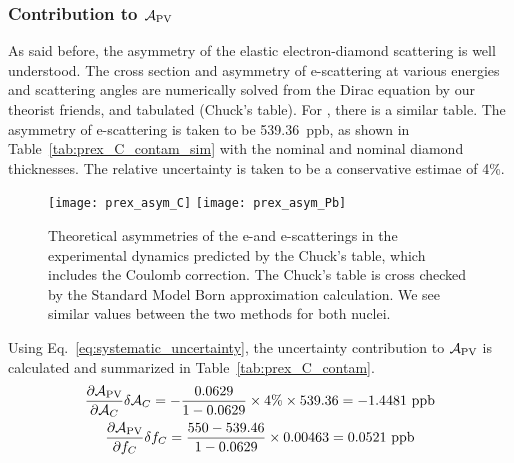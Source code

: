 \subsubsection{Contribution to $\mathcal{A}_{\text{PV}}$}
As said before, the asymmetry of the elastic electron-diamond scattering is well understood.
The cross section and asymmetry of e-\Carbon scattering at various energies 
and scattering angles are numerically solved from the Dirac equation by our 
theorist friends, and tabulated (Chuck's table). For \Pb, there is a similar table.
The asymmetry of e-\Carbon scattering is taken to be 539.36~ppb, as shown in 
Table~\ref{tab:prex_C_contam_sim}
with the nominal \Pb and nominal diamond thicknesses. The relative uncertainty is taken
to be a conservative estimae of 4\%.
\begin{figure}[!h]
    \centering
    \texttt{[image: prex\_asym\_C]}
    \texttt{[image: prex\_asym\_Pb]}
    \caption[Theoretical asymmetries of the e-\Carbon and e-\Pb scattering]
    {Theoretical asymmetries of the e-\Carbon and e-\Pb scatterings in the experimental 
    dynamics predicted by the Chuck's table, which includes the Coulomb correction. 
    The Chuck's table is cross checked by the Standard Model Born approximation 
    calculation. We see similar values between the two methods for both nuclei.}
    \label{fig:prex_asym}
\end{figure}

Using Eq.~\ref{eq:systematic_uncertainty}, the uncertainty contribution to $\mathcal{A}_{\text{PV}}$
is calculated and summarized in Table~\ref{tab:prex_C_contam}.
\begin{equation}
    \begin{gathered}
	\frac{\partial \mathcal{A}_{\text{PV}}}{\partial \mathcal{A}_C} \delta \mathcal{A}_C = 
	-\frac{0.0629}{1 - 0.0629} \times 4\% \times 539.36 = -1.4481\ \mathrm{ppb}   \\
	\frac{\partial \mathcal{A}_{\text{PV}}}{\partial f_C}\delta f_C =
	\frac{550 - 539.46}{1 - 0.0629} \times 0.00463 = 0.0521\ \mathrm{ppb}	\\
    \end{gathered}
\end{equation}

